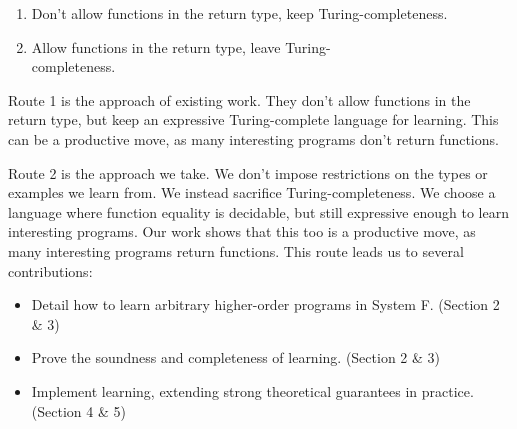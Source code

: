 \documentclass[sigplan,10pt]{acmart}
\theoremstyle{mytheoremstyle}
\begin{document}
\begin{enumerate}
\item Don't allow functions in the return type, keep Turing-completeness.
\item Allow functions in the return type, leave Turing-\\completeness.
\end{enumerate}

Route 1 is the approach of existing work. They don't allow functions in the return type, but keep an expressive Turing-complete language for learning. This can be a productive move, as many interesting programs don't return functions.

Route 2 is the approach we take. We don't impose restrictions on the types or examples we learn from. We instead sacrifice Turing-completeness. We choose a language where function equality is decidable, but still expressive enough to learn interesting programs. Our work shows that this too is a productive move, as many interesting programs return functions. This route leads us to several contributions:
\begin{itemize}
\item Detail how to learn arbitrary higher-order programs in System F. (Section 2 \& 3)
\item Prove the soundness and completeness of learning. (Section 2 \& 3)
\item Implement learning, extending strong theoretical guarantees in practice. (Section 4 \& 5)
\end{itemize}
\end{document}
